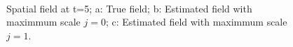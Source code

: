 \documentclass[11pt,draftcls,onecolumn,peerreview]{IEEEtran}
\begin{document}
{{\begin{figure}[!t]
\end{figure}
\begin{figure}[!th] 
\\ 
\caption{Spatial field at t=5; a: True field; b: Estimated field with maximmum scale $j=0$; c: Estimated field with maximmum scale $j=1$.}
\label{fig:2DFieldEstimation1}

\end{figure}}}
\end{document}
